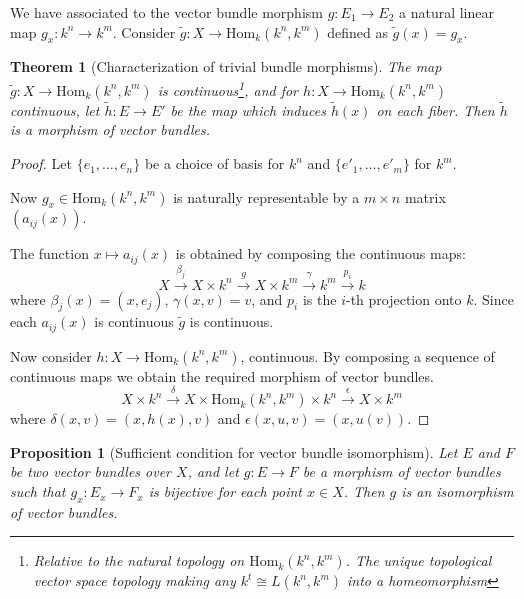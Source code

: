 \documentclass[12pt]{article}
\numberwithin{equation}{section}
\newcommand{\Hom}{{\mathrm{Hom}}}
\newcounter{dummy} \numberwithin{dummy}{section}
\newtheorem{theorem}[dummy]{Theorem}
\newtheorem{proposition}[dummy]{Proposition}
\begin{document}
	We have associated to the vector bundle morphism $g: E_1 \to E_2$ a natural linear map $g_x: k^n \to k^m$. Consider $\widetilde{g}: X \to \Hom_k(k^n, k^m)$ defined as $\widetilde{g}(x)=g_x.$
	\begin{theorem}[Characterization of trivial bundle morphisms]\label{thtrivialbundlemorphisms}
		The map $\tilde{g}: X \to \text{Hom}_k(k^n, k^m)$ is continuous\footnote{Relative to the natural topology on $\text{Hom}_k(k^n, k^m)$. The unique topological vector space topology making any $k^t \cong L(k^n,k^m)$ into a homeomorphism}, and for ${h}: X \to \text{Hom}_k(k^n, k^m)$ continuous, let $\tilde{h}: E \to E'$ be the map which induces $\tilde{h}(x)$ on each fiber. Then $\tilde{h}$ is a morphism of vector bundles.
	\end{theorem}
	\begin{proof}
		Let $\{e_1, \dots, e_n\}$ be a choice of basis for $k^n$ and $\{e'_1, \dots, e'_m\}$ for $k^m$.  
		
		Now ${g}_x \in \text{Hom}_k(k^n, k^m)$ is naturally representable by a $m\times n$ matrix $(a_{ij}(x))$.
		
		The function $x \mapsto a_{ij}(x)$ is obtained by composing the continuous maps:
		\[ X \xrightarrow{\beta_j} X \times k^n \xrightarrow{g} X \times k^m \xrightarrow{\gamma} k^m \xrightarrow{p_i} k \]
		where $\beta_j(x) = (x, e_j)$, $\gamma(x, v) = v$, and $p_i$ is the $i$-th projection onto $k$. Since each $a_{ij}(x)$ is continuous $\tilde{g}$ is continuous.
		
		Now consider ${h}: X \to \text{Hom}_k(k^n, k^m)$, continuous. By composing a sequence of continuous maps we obtain the required morphism of vector bundles.
		\[ X \times k^n \xrightarrow{\delta} X \times \text{Hom}_k(k^n, k^m) \times k^n \xrightarrow{\epsilon} X \times k^m \]
		where $\delta(x, v) = (x, {h}(x), v)$ and $\epsilon(x, u, v) = (x, u(v))$.
	\end{proof}

	\begin{proposition}[Sufficient condition for vector bundle isomorphism]\label{propsciso}
	Let $E$ and $F$ be two vector bundles over $X$, and let $g: E \to F$ be a morphism of vector bundles such that $g_x: E_x \to F_x$ is bijective for each point $x \in X$. Then $g$ is an isomorphism of vector bundles.
	\end{proposition}
	
\end{document}
